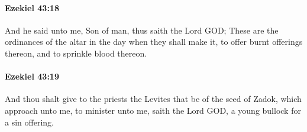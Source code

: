 		\paragraph{Ezekiel 43:18} %
			\label{EZEKIEL-43-18}

			And he said unto me, Son of man, thus saith the Lord GOD; These are the ordinances of the altar in the day when they shall make it, to offer burnt offerings thereon, and to sprinkle blood thereon.


		\paragraph{Ezekiel 43:19} %
			\label{EZEKIEL-43-19}

			And thou shalt give to the priests the Levites that be of the seed of Zadok, which approach unto me, to minister unto me, saith the Lord GOD, a young bullock for a sin offering.

